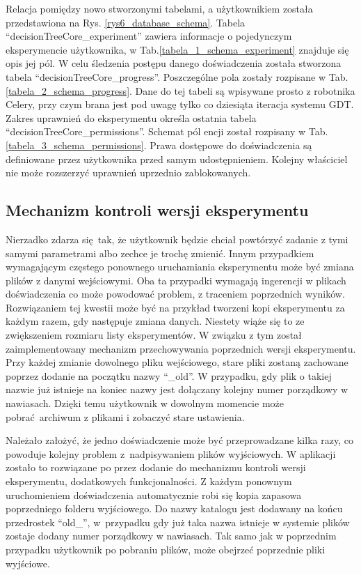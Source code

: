 Relacja pomiędzy nowo stworzonymi tabelami, a użytkownikiem została przedstawiona na Rys. \ref{rys6_database_schema}. Tabela \enquote{decisionTreeCore\_experiment} zawiera informacje o pojedynczym eksperymencie użytkownika, w Tab.\ref{tabela_1_schema_experiment} znajduje się opis jej pól. W celu śledzenia postępu danego doświadczenia została stworzona tabela \enquote{decisionTreeCore\_progress}. Poszczególne pola zostały rozpisane w Tab.\ref{tabela_2_schema_progress}. Dane do tej tabeli są wpisywane prosto z robotnika Celery, przy czym brana jest pod uwagę tylko co dziesiąta iteracja systemu GDT. Zakres uprawnień do eksperymentu określa ostatnia tabela \enquote{decisionTreeCore\_permissions}. Schemat pól encji został rozpisany w Tab.\ref{tabela_3_schema_permissions}. Prawa dostępowe do doświadczenia są definiowane przez użytkownika przed samym udostępnieniem. Kolejny właściciel nie może rozszerzyć uprawnień uprzednio zablokowanych.  





\subsection{Mechanizm kontroli wersji eksperymentu}
Nierzadko zdarza się tak, że użytkownik będzie chciał powtórzyć zadanie z tymi samymi parametrami albo zechce je trochę zmienić. Innym przypadkiem wymagającym częstego ponownego uruchamiania eksperymentu może być zmiana plików z danymi wejściowymi. Oba ta przypadki wymagają ingerencji w plikach doświadczenia co może powodować problem, z traceniem poprzednich wyników. Rozwiązaniem tej kwestii może być na przykład tworzeni kopi eksperymentu za każdym razem, gdy następuje zmiana danych. Niestety wiąże się to ze zwiększeniem rozmiaru listy eksperymentów. W związku z tym został zaimplementowany mechanizm przechowywania poprzednich wersji eksperymentu. Przy każdej zmianie dowolnego pliku wejściowego, stare pliki zostaną zachowane poprzez dodanie na początku nazwy \enquote{\_old}. W przypadku, gdy plik o takiej nazwie już istnieje na koniec nazwy jest dołączany kolejny numer porządkowy w nawiasach. Dzięki temu użytkownik w dowolnym momencie może pobrać archiwum z plikami i zobaczyć stare ustawienia.

Należało założyć, że jedno doświadczenie może być przeprowadzane kilka razy, co powoduje kolejny problem z~nadpisywaniem plików wyjściowych. W aplikacji zostało to rozwiązane po przez dodanie do mechanizmu kontroli wersji eksperymentu, dodatkowych funkcjonalności. Z każdym ponownym uruchomieniem doświadczenia automatycznie robi się kopia zapasowa poprzedniego folderu wyjściowego. Do nazwy katalogu jest dodawany na końcu przedrostek \enquote{old\_}, w~przypadku gdy już taka nazwa istnieje w systemie plików zostaje dodany numer porządkowy w nawiasach. Tak samo jak w poprzednim przypadku użytkownik po pobraniu plików, może obejrzeć poprzednie pliki wyjściowe. 

